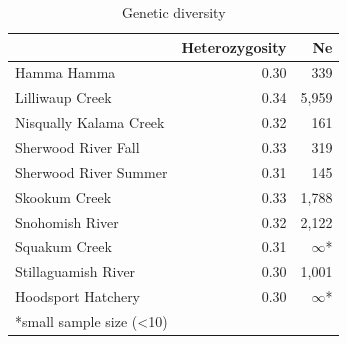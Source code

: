 \documentclass[12pt, one column]{article}
\begin{document}
\begin{table}[H]
\caption{Genetic diversity} 
\begin{tabular}{lrr}
\toprule
{} & Heterozygosity &     Ne \\
\midrule
Hamma Hamma            &           0.30 &    339 \\
Lilliwaup Creek        &           0.34 &  5,959 \\
Nisqually Kalama Creek &           0.32 &    161 \\
Sherwood River Fall    &           0.33 &    319 \\
Sherwood River Summer  &           0.31 &    145 \\
Skookum Creek          &           0.33 &  1,788 \\
Snohomish River        &           0.32 &  2,122 \\
Squakum Creek          &           0.31 & $\infty$* \\
Stillaguamish River    &           0.30 &  1,001 \\
\midrule
Hoodsport Hatchery     &           0.30 & $\infty$* \\
\bottomrule
\multicolumn{3}{l}{*small sample size (\textless10)}
\end{tabular}

\end {table}

\pagebreak
\end{document}
